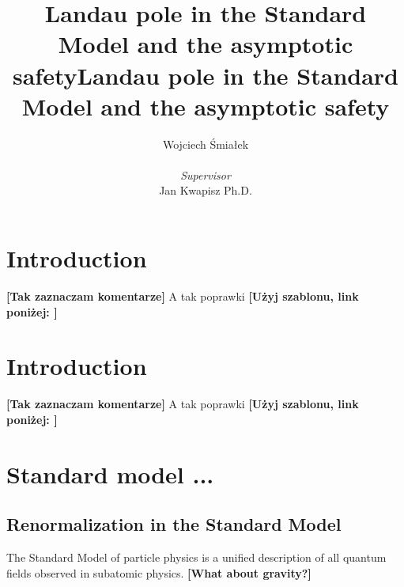 \documentclass[11pt, a4paper]{article}
\title{\vspace{-2cm}Landau pole in the Standard Model and the asymptotic safety}
\title{\vspace{-2cm}Landau pole in the Standard Model and the asymptotic safety}
\author{{Wojciech Śmiałek}\\
\\
{\textit{Supervisor}} \\
{Jan Kwapisz Ph.D.}}
{Jan Kwapisz Ph.D.}}
\date{}
\newcommand{\jhk}[1]{{\color{red}#1}}
\newcommand{\jhkbf}[1]{\textbf{\color{red} [#1]}}
\newcommand{\jhk}[1]{{\color{red}#1}}
\newcommand{\jhkbf}[1]{\textbf{\color{red} [#1]}}
\begin{document}
\maketitle

\section{Introduction}
\jhkbf{Tak zaznaczam komentarze}
\jhk{A tak poprawki}
\jhkbf{Użyj szablonu, link poniżej: }

\section{Introduction}
\jhkbf{Tak zaznaczam komentarze}
\jhk{A tak poprawki}
\jhkbf{Użyj szablonu, link poniżej: }


\section{Standard model ...}
\subsection{Renormalization in the Standard Model}
The Standard Model of particle physics is a unified description of all quantum fields observed in subatomic physics.  \jhkbf{What about gravity?}
\end{document}
